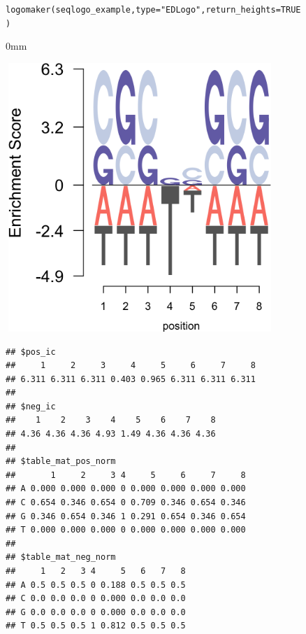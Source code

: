 \documentclass[12pt]{article}\usepackage[]{graphicx}\usepackage[usenames,dvipsnames]{color}
\newcommand{\hlnum}[1]{\textcolor[rgb]{0.816,0.125,0.439}{#1}}%
\newcommand{\hlstr}[1]{\textcolor[rgb]{0.251,0.627,0.251}{#1}}%
\newcommand{\hlstd}[1]{\textcolor[rgb]{0.251,0.251,0.251}{#1}}%
\newcommand{\hlkwc}[1]{\textcolor[rgb]{0.251,0.251,0.251}{#1}}%
\newcommand{\hlkwd}[1]{\textcolor[rgb]{0.878,0.439,0.125}{#1}}%
\newenvironment{knitrout}{}{} %
\begin{document}
\begin{figure}[h]
\begin{center}
\begin{knitrout}
\color{fgcolor}\begin{kframe}
\begin{alltt}
\hlkwd{logomaker}\hlstd{(seqlogo_example,} \hlkwc{type} \hlstd{=} \hlstr{"EDLogo"}\hlstd{,} \hlkwc{return_heights} \hlstd{=} \hlnum{TRUE}\hlstd{)}
\end{alltt}
\end{kframe}\begin{adjustwidth}{\fltoffset}{0mm}

\includegraphics[width=4in,height=4in]{figure/edlogo_3-1} \hfill{}

\end{adjustwidth}\begin{kframe}\begin{verbatim}
## $pos_ic
##     1     2     3     4     5     6     7     8 
## 6.311 6.311 6.311 0.403 0.965 6.311 6.311 6.311 
## 
## $neg_ic
##    1    2    3    4    5    6    7    8 
## 4.36 4.36 4.36 4.93 1.49 4.36 4.36 4.36 
## 
## $table_mat_pos_norm
##       1     2     3 4     5     6     7     8
## A 0.000 0.000 0.000 0 0.000 0.000 0.000 0.000
## C 0.654 0.346 0.654 0 0.709 0.346 0.654 0.346
## G 0.346 0.654 0.346 1 0.291 0.654 0.346 0.654
## T 0.000 0.000 0.000 0 0.000 0.000 0.000 0.000
## 
## $table_mat_neg_norm
##     1   2   3 4     5   6   7   8
## A 0.5 0.5 0.5 0 0.188 0.5 0.5 0.5
## C 0.0 0.0 0.0 0 0.000 0.0 0.0 0.0
## G 0.0 0.0 0.0 0 0.000 0.0 0.0 0.0
## T 0.5 0.5 0.5 1 0.812 0.5 0.5 0.5
\end{verbatim}
\end{kframe}
\end{knitrout}
\end{center}
\end{figure}
\end{document}
